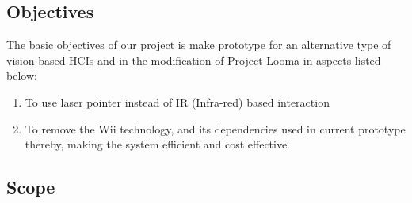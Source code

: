 \documentclass[12pt, a4paper]{article}
\begin{document}
\subsection{Objectives}
The basic objectives of our project is make prototype for an alternative type of vision-based HCIs and in the modification of Project Looma in aspects listed below:
\begin{enumerate}
	\item To use laser pointer instead of IR (Infra-red) based interaction
	\item To remove the Wii technology, and its dependencies used in current prototype thereby, making the system efficient and cost effective
\end{enumerate}
\subsection{Scope}
\end{document}

